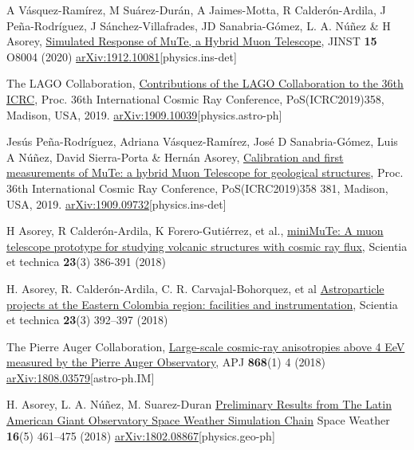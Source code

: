 \begin{etaremune}
\item {} A Vásquez-Ramírez, M Suárez-Durán, A Jaimes-Motta, R Calderón-Ardila, J Peña-Rodríguez, J Sánchez-Villafrades, JD Sanabria-Gómez, L. A. Núñez \& H Asorey, \href{https://doi.org/10.1088/1748-0221/15/08/P08004}{{Simulated Response of MuTe, a Hybrid Muon Telescope}}, JINST {\bf{15}} O8004 (2020) \href{https://arxiv.org/abs/1912.10081}{arXiv:1912.10081}[physics.ins-det]

\item {} The LAGO Collaboration, \href{https://arxiv.org/abs/1909.10039}{Contributions of the LAGO Collaboration to the 36th ICRC}, \en Proc. 36th International Cosmic Ray Conference, PoS(ICRC2019)358, Madison, USA, 2019. \href{http://arxiv.org/abs/1909.10039}{arXiv:1909.10039}[physics.astro-ph]

\item {} Jesús Peña-Rodríguez, Adriana Vásquez-Ramírez, José D Sanabria-Gómez, Luis A Núñez, David Sierra-Porta \& Hernán Asorey, \href{https://pos.sissa.it/358/381/}{Calibration and first measurements of MuTe: a hybrid Muon Telescope for geological structures}, \en Proc. 36th International Cosmic Ray Conference, PoS(ICRC2019)358 381, Madison, USA, 2019. \href{http://arxiv.org/abs/1909.09732}{arXiv:1909.09732}[physics.ins-det]

\item {} H Asorey, R Calderón-Ardila, K Forero-Gutiérrez, et al., \href{http://dx.doi.org/10.22517/23447214.17501}{miniMuTe: A muon telescope prototype for studying volcanic structures with cosmic ray flux}, Scientia et technica {\bf{23}}(3) 386-391 (2018)

\item {}H. Asorey, R. Calderón-Ardila, C. R. Carvajal-Bohorquez, et al \href{http://dx.doi.org/10.22517/23447214.17561}{Astroparticle projects at the Eastern Colombia region: facilities and instrumentation}, Scientia et technica {\bf{23}}(3) 392--397 (2018)

\item {}The Pierre Auger Collaboration, \href{}{{Large-scale cosmic-ray anisotropies above 4 EeV measured by the Pierre Auger Observatory}}, APJ {\bf{868}}(1) 4 (2018) \href{https://arxiv.org/abs/1808.03579}{arXiv:1808.03579}[astro-ph.IM]

\item {}H. Asorey, L. A. Núñez, M. Suarez-Duran \href{https://doi.org/10.1002/2017SW001774}{{Preliminary Results from The Latin American Giant Observatory Space Weather Simulation Chain}} Space Weather {\bf{16}}(5) 461--475 (2018) \href{https://arxiv.org/abs/1802.08867}{arXiv:1802.08867}[physics.geo-ph]


\end{etaremune}
